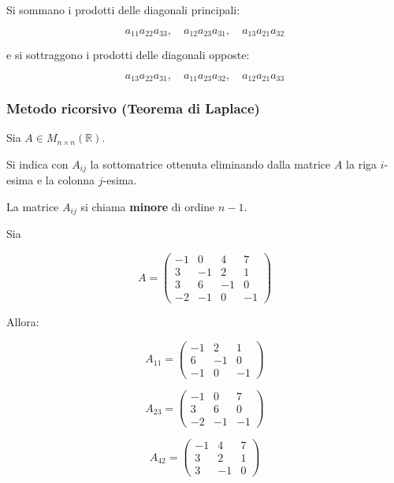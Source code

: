 \documentclass[
  a4paper,
]{article}
\begin{document}
Si sommano i prodotti delle diagonali principali:

\[
a_{11}a_{22}a_{33},
\quad
a_{12}a_{23}a_{31},
\quad
a_{13}a_{21}a_{32}
\]

e si sottraggono i prodotti delle diagonali opposte:

\[
a_{13}a_{22}a_{31},
\quad
a_{11}a_{23}a_{32},
\quad
a_{12}a_{21}a_{33}
\]

\hypertarget{metodo-ricorsivo-teorema-di-laplace}{%
\subsubsection{Metodo ricorsivo (Teorema di
Laplace)}\label{metodo-ricorsivo-teorema-di-laplace}}

\begin{definitionbox}
Sia \(A\in M_{n\times n}(\mathbb{R})\).

Si indica con \(A_{ij}\) la sottomatrice ottenuta eliminando dalla
matrice \(A\) la riga \(i\)-esima e la colonna \(j\)-esima.

La matrice \(A_{ij}\) si chiama \textbf{minore} di ordine \(n-1\).
\end{definitionbox}

\begin{examplebox}
Sia

\[
A=
\begin{pmatrix}
-1 & 0 & 4 & 7\\
3 & -1 & 2 & 1\\
3 & 6 & -1 & 0\\
-2 & -1 & 0 & -1
\end{pmatrix}
\]

Allora:

\[
A_{11}=
\begin{pmatrix}
-1 & 2 & 1\\
6 & -1 & 0\\
-1 & 0 & -1
\end{pmatrix}
\]

\[
A_{23}=
\begin{pmatrix}
-1 & 0 & 7\\
3 & 6 & 0\\
-2 & -1 & -1
\end{pmatrix}
\]

\[
A_{42}=
\begin{pmatrix}
-1 & 4 & 7\\
3 & 2 & 1\\
3 & -1 & 0
\end{pmatrix}
\]
\end{examplebox}
\end{document}
